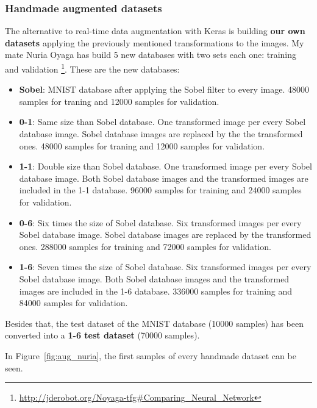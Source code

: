 \subsubsection{Handmade augmented datasets}\label{subsec:handmade}
The alternative to real-time data augmentation with Keras is building \textbf{our own datasets} applying the previously mentioned transformations to the images. My mate Nuria Oyaga has build 5 new databases with two sets each one: training and validation \footnote{\url{http://jderobot.org/Noyaga-tfg\#Comparing_Neural_Network}}. These are the new databases: 
\begin{itemize}
	\item \textbf{Sobel}: MNIST database after applying the Sobel filter to every image. 48000 samples for traning and 12000 samples for validation. 
	\item \textbf{0-1}: Same size than Sobel database. One transformed image per every Sobel database image. Sobel database images are replaced by the the transformed ones. 48000 samples for traning and 12000 samples for validation. 
	\item \textbf{1-1}: Double size than Sobel database. One transformed image per every Sobel database image. Both Sobel database images and the transformed images are included in the 1-1 database. 96000 samples for training and 24000 samples for validation. 
	\item \textbf{0-6}: Six times the size of Sobel database. Six transformed images per every Sobel database image. Sobel database images are replaced by the transformed ones. 288000 samples for training and 72000 samples for validation. 
	\item \textbf{1-6}: Seven times the size of Sobel database. Six transformed images per every Sobel database image. Both Sobel database images and the transformed images are included in the 1-6 database. 336000 samples for training and 84000 samples for validation. 
\end{itemize}

Besides that, the test dataset of the MNIST database (10000 samples) has been converted into a \textbf{1-6 test dataset} (70000 samples).

In Figure~\ref{fig:aug_nuria}, the first samples of every handmade dataset can be seen.

